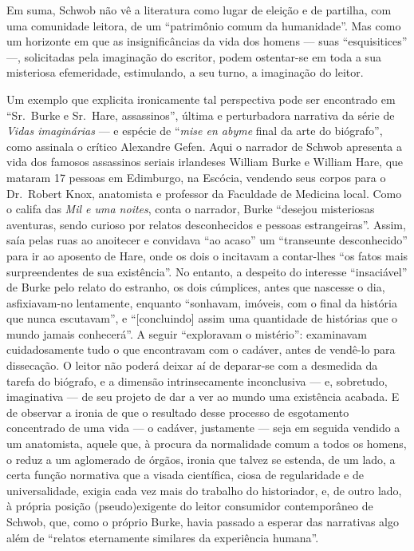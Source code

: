 Em suma, Schwob não vê a literatura como lugar de eleição e de partilha, com uma
comunidade leitora, de um “patrimônio comum da humanidade”. Mas como um
horizonte em que as insignificâncias da vida dos homens --- suas “esquisitices”
---, solicitadas pela imaginação do escritor, podem ostentar-se em toda a sua
misteriosa efemeridade, estimulando, a seu turno, a imaginação do leitor. 

Um exemplo que explicita ironicamente tal perspectiva pode ser encontrado em
``Sr.~Burke e Sr.~Hare, assassinos'', última e perturbadora narrativa da
série de \textit{Vidas imaginárias} --- e espécie de “\textit{mise en abyme}
final da arte do biógrafo”, como assinala o crítico Alexandre Gefen. Aqui o
narrador de Schwob apresenta a vida dos famosos assassinos seriais irlandeses
William Burke e William Hare, que mataram 17 pessoas em Edimburgo, na Escócia,
vendendo seus corpos para o Dr.~Robert Knox, anatomista e professor da
Faculdade de Medicina local. Como o califa das \textit{Mil e uma noites}, conta
o narrador, Burke “desejou misteriosas aventuras, sendo curioso por relatos
desconhecidos e pessoas estrangeiras”. Assim, saía pelas ruas ao anoitecer e
convidava “ao acaso” um “transeunte desconhecido” para ir ao aposento de Hare,
onde os dois o incitavam a contar-lhes “os fatos mais surpreendentes de sua
existência”. No entanto, a despeito do interesse “insaciável” de Burke pelo
relato do estranho, os dois cúmplices, antes que nascesse o dia, asfixiavam-no
lentamente, enquanto “sonhavam, imóveis, com o final da história que nunca
escutavam”, e “[concluindo] assim uma quantidade de histórias que o mundo
jamais conhecerá”. A seguir “exploravam o mistério”: examinavam cuidadosamente
tudo o que encontravam com o cadáver, antes de vendê-lo para dissecação. 
\pagebreak
O leitor não poderá deixar aí de deparar-se com a desmedida da tarefa do
biógrafo, e a dimensão intrinsecamente inconclusiva --- e, sobretudo, imaginativa
--- de seu projeto de dar a ver ao mundo uma existência acabada. E de observar a
ironia de que o resultado desse processo de esgotamento concentrado de uma vida
--- o cadáver, justamente --- seja em seguida vendido a um anatomista, aquele que,
à procura da normalidade comum a todos os homens, o reduz a um aglomerado de
órgãos, ironia que talvez se estenda, de um lado, a certa função normativa que
a visada científica, ciosa de regularidade e de universalidade, exigia cada vez
mais do trabalho do historiador, e, de outro lado, à própria posição
(pseudo)exigente do leitor consumidor contemporâneo de Schwob, que, como o
próprio Burke, havia passado a esperar das narrativas algo além de “relatos
eternamente similares da experiência humana”.

